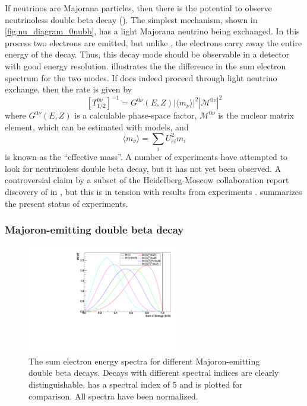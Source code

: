 \documentclass[herrin-thesis.tex]{subfiles}
\begin{document}
If neutrinos are Majorana particles, then there is the potential to observe neutrinoless double beta decay (\zeronu{}). The simplest mechanism, shown in \cref{fig:nu_diagram_0nubb}, has a light Majorana neutrino being exchanged. In this process two electrons are emitted, but unlike \twonu{}, the electrons carry away the entire energy of the decay. Thus, this decay mode should be observable in a detector with good energy resolution.  illustrates the the difference in the sum electron spectrum for the two modes. If \zeronu{} does indeed proceed through light neutrino exchange, then the rate is given by
\begin{equation}
\left [ T^{0\nu}_{1/2} \right ]^{-1} = G^{0\nu}\left(E, Z\right)\left | \langle m_{\nu} \rangle \right |^2\left | \mathcal{M}^{0\nu}\right |^2
\label{eq:nu_zeronu_rate}
\end{equation}
where \(G^{0\nu}(E,Z)\) is a calculable phase-space factor, \( \mathcal{M}^{0\nu}\) is the nuclear matrix element, which can be estimated with models, and
\begin{equation}
\langle m_{\nu} \rangle = \sum_i U_{e i}^2 m_i
\label{eq:nu_meff_def}
\end{equation}
is known as the ``effective mass''. A number of experiments have attempted to look for neutrinoless double beta decay, but it has not yet been observed. A controversial claim by a subset of the Heidelberg-Moscow collaboration report discovery of \zeronu{} in  \cite{KlapdorKleingrothaus:2006ff}, but this is in tension with results from  experiments \cite{Auger:2012ar,Gando:2013fk}.  summarizes the present status of experiments.

\subsubsection{Majoron-emitting double beta decay}

\begin{figure}[htp]
	\centering
	\includegraphics[width=0.6\textwidth]{./plots/nu_majoron_spectra}
	\caption[Spectra for Majoron-emitting double beta decay modes]{The sum electron energy spectra for different Majoron-emitting double beta decays. Decays with different spectral indices are clearly distinguishable. \twonu{} has a spectral index of 5 and is plotted for comparison. All spectra have been normalized.}
	\label{fig:nu_majoron_spectra}
\end{figure}
\end{document}
